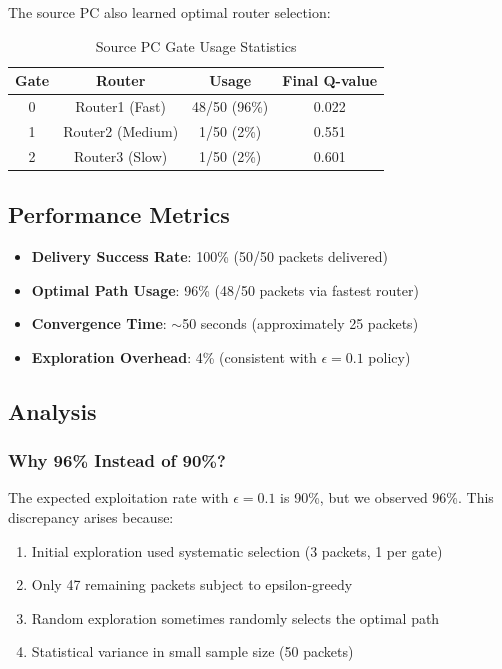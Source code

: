 \documentclass[12pt,a4paper]{article}
\begin{document}
The source PC also learned optimal router selection:

\begin{table}[h]
\centering
\begin{tabular}{|c|c|c|c|}
\hline
\textbf{Gate} & \textbf{Router} & \textbf{Usage} & \textbf{Final Q-value} \\
\hline
0 & Router1 (Fast) & 48/50 (96\%) & 0.022 \\
1 & Router2 (Medium) & 1/50 (2\%) & 0.551 \\
2 & Router3 (Slow) & 1/50 (2\%) & 0.601 \\
\hline
\end{tabular}
\caption{Source PC Gate Usage Statistics}
\label{tab:usage}
\end{table}

\subsection{Performance Metrics}

\begin{itemize}
    \item \textbf{Delivery Success Rate}: 100\% (50/50 packets delivered)
    \item \textbf{Optimal Path Usage}: 96\% (48/50 packets via fastest router)
    \item \textbf{Convergence Time}: $\sim$50 seconds (approximately 25 packets)
    \item \textbf{Exploration Overhead}: 4\% (consistent with $\epsilon = 0.1$ policy)
\end{itemize}

\subsection{Analysis}

\subsubsection{Why 96\% Instead of 90\%?}

The expected exploitation rate with $\epsilon = 0.1$ is 90\%, but we observed 96\%. This discrepancy arises because:

\begin{enumerate}
    \item Initial exploration used systematic selection (3 packets, 1 per gate)
    \item Only 47 remaining packets subject to epsilon-greedy
    \item Random exploration sometimes randomly selects the optimal path
    \item Statistical variance in small sample size (50 packets)
\end{enumerate}
\end{document}
